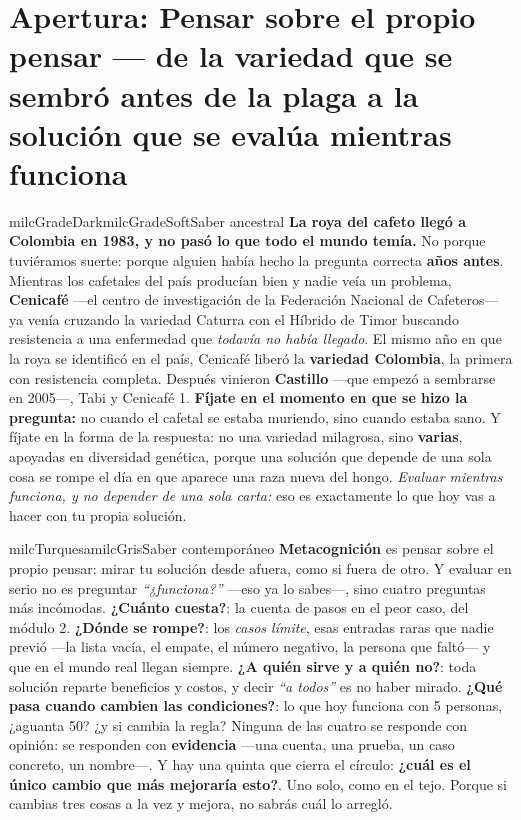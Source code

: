 \documentclass[11pt,letterpaper]{article}
\begin{document}
\section*{Apertura: Pensar sobre el propio pensar --- de la variedad que se sembró antes de la plaga a la solución que se evalúa mientras funciona}

\begin{softbox}{milcGradeDark}{milcGradeSoft}{Saber ancestral}
\textbf{La roya del cafeto llegó a Colombia en 1983, y no pasó lo que todo el mundo temía.} No porque tuviéramos suerte: porque alguien había hecho la pregunta correcta \textbf{años antes}. Mientras los cafetales del país producían bien y nadie veía un problema, \textbf{Cenicafé} ---el centro de investigación de la Federación Nacional de Cafeteros--- ya venía cruzando la variedad Caturra con el Híbrido de Timor buscando resistencia a una enfermedad que \emph{todavía no había llegado}. El mismo año en que la roya se identificó en el país, Cenicafé liberó la \textbf{variedad Colombia}, la primera con resistencia completa. Después vinieron \textbf{Castillo} ---que empezó a sembrarse en 2005---, Tabi y Cenicafé 1. \textbf{Fíjate en el momento en que se hizo la pregunta:} no cuando el cafetal se estaba muriendo, sino cuando estaba sano. Y fíjate en la forma de la respuesta: no una variedad milagrosa, sino \textbf{varias}, apoyadas en diversidad genética, porque una solución que depende de una sola cosa se rompe el día en que aparece una raza nueva del hongo. \emph{Evaluar mientras funciona, y no depender de una sola carta:} eso es exactamente lo que hoy vas a hacer con tu propia solución.
\end{softbox}

\begin{softbox}{milcTurquesa}{milcGris}{Saber contemporáneo}
\textbf{Metacognición} es pensar sobre el propio pensar: mirar tu solución desde afuera, como si fuera de otro. Y evaluar en serio no es preguntar \emph{``¿funciona?''} ---eso ya lo sabes---, sino cuatro preguntas más incómodas. \textbf{¿Cuánto cuesta?}: la cuenta de pasos en el peor caso, del módulo 2. \textbf{¿Dónde se rompe?}: los \emph{casos límite}, esas entradas raras que nadie previó ---la lista vacía, el empate, el número negativo, la persona que faltó--- y que en el mundo real llegan siempre. \textbf{¿A quién sirve y a quién no?}: toda solución reparte beneficios y costos, y decir \emph{``a todos''} es no haber mirado. \textbf{¿Qué pasa cuando cambien las condiciones?}: lo que hoy funciona con 5 personas, ¿aguanta 50? ¿y si cambia la regla? Ninguna de las cuatro se responde con opinión: se responden con \textbf{evidencia} ---una cuenta, una prueba, un caso concreto, un nombre---. Y hay una quinta que cierra el círculo: \textbf{¿cuál es el único cambio que más mejoraría esto?}. Uno solo, como en el tejo. Porque si cambias tres cosas a la vez y mejora, no sabrás cuál lo arregló.
\end{softbox}
\end{document}
